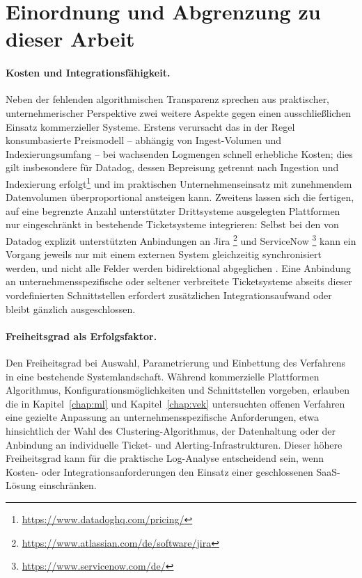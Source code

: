 \section{Einordnung und Abgrenzung zu dieser Arbeit}
\label{sec:kommerziell_einordnung}


\paragraph{Kosten und Integrationsfähigkeit.}
Neben der fehlenden algorithmischen Transparenz sprechen aus praktischer, unternehmerischer Perspektive zwei weitere Aspekte gegen einen ausschließlichen Einsatz kommerzieller Systeme. Erstens verursacht das in der Regel konsumbasierte Preismodell -- abhängig von Ingest-Volumen und Indexierungsumfang -- bei wachsenden Logmengen schnell erhebliche Kosten; dies gilt insbesondere für Datadog, dessen Bepreisung getrennt nach Ingestion und Indexierung erfolgt\footnote{\url{https://www.datadoghq.com/pricing/}} und im praktischen Unternehmenseinsatz mit zunehmendem Datenvolumen überproportional ansteigen kann. Zweitens lassen sich die fertigen, auf eine begrenzte Anzahl unterstützter Drittsysteme ausgelegten Plattformen nur eingeschränkt in bestehende Ticketsysteme integrieren: Selbst bei den von Datadog explizit unterstützten Anbindungen an Jira \footnote{\url{https://www.atlassian.com/de/software/jira}} und ServiceNow \footnote{\url{https://www.servicenow.com/de/}} kann ein Vorgang jeweils nur mit einem externen System gleichzeitig synchronisiert werden, und nicht alle Felder werden bidirektional abgeglichen \cite{datadogTicketingIntegrations}. Eine Anbindung an unternehmensspezifische oder seltener verbreitete Ticketsysteme abseits dieser vordefinierten Schnittstellen erfordert zusätzlichen Integrationsaufwand oder bleibt gänzlich ausgeschlossen.

\paragraph{Freiheitsgrad als Erfolgsfaktor.}
Den Freiheitsgrad bei Auswahl, Parametrierung und Einbettung des Verfahrens in eine bestehende Systemlandschaft. Während kommerzielle Plattformen Algorithmus, Konfigurationsmöglichkeiten und Schnittstellen vorgeben, erlauben die in Kapitel~\ref{chap:ml} und Kapitel~\ref{chap:vek} untersuchten offenen Verfahren eine gezielte Anpassung an unternehmensspezifische Anforderungen, etwa hinsichtlich der Wahl des Clustering-Algorithmus, der Datenhaltung oder der Anbindung an individuelle Ticket- und Alerting-Infrastrukturen. Dieser höhere Freiheitsgrad kann für die praktische Log-Analyse entscheidend sein, wenn Kosten- oder Integrationsanforderungen den Einsatz einer geschlossenen \ac{SaaS}-Lösung einschränken.

